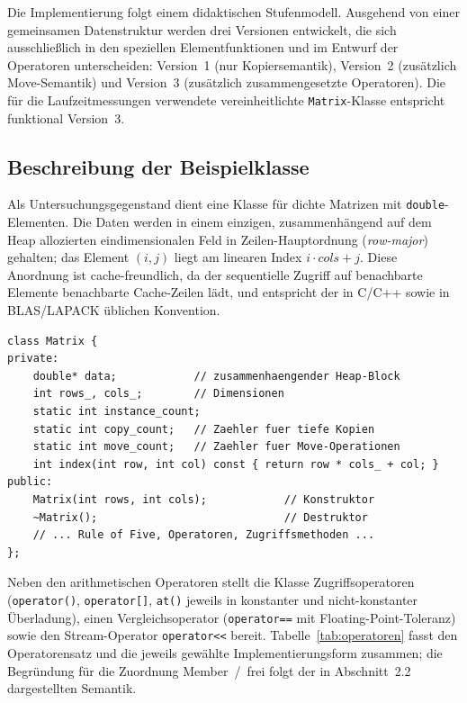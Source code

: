 \documentclass[10pt,a4paper]{article}
\begin{document}
Die Implementierung folgt einem didaktischen Stufenmodell. Ausgehend von einer
gemeinsamen Datenstruktur werden drei Versionen entwickelt, die sich
ausschließlich in den speziellen Elementfunktionen und im Entwurf der
Operatoren unterscheiden: Version~1 (nur Kopiersemantik), Version~2
(zusätzlich Move-Semantik) und Version~3 (zusätzlich zusammengesetzte
Operatoren). Die für die Laufzeitmessungen verwendete vereinheitlichte
\texttt{Matrix}-Klasse entspricht funktional Version~3.

\subsection{Beschreibung der Beispielklasse}
\label{sec:beispielklasse}

Als Untersuchungsgegenstand dient eine Klasse für dichte Matrizen mit
\texttt{double}-Elementen. Die Daten werden in einem einzigen, zusammenhängend
auf dem Heap allozierten eindimensionalen Feld in Zeilen-Hauptordnung
(\emph{row-major}) gehalten; das Element $(i,j)$ liegt am linearen Index
$i \cdot \mathit{cols} + j$. Diese Anordnung ist cache-freundlich, da der
sequentielle Zugriff auf benachbarte Elemente benachbarte Cache-Zeilen lädt,
und entspricht der in C/C++ sowie in BLAS/LAPACK üblichen Konvention.

\begin{lstlisting}[caption={Datenmodell und Instrumentierung der Matrix-Klasse}, label={lst:skeleton}]
class Matrix {
private:
    double* data;            // zusammenhaengender Heap-Block
    int rows_, cols_;        // Dimensionen
    static int instance_count;
    static int copy_count;   // Zaehler fuer tiefe Kopien
    static int move_count;   // Zaehler fuer Move-Operationen
    int index(int row, int col) const { return row * cols_ + col; }
public:
    Matrix(int rows, int cols);            // Konstruktor
    ~Matrix();                             // Destruktor
    // ... Rule of Five, Operatoren, Zugriffsmethoden ...
};
\end{lstlisting}

Neben den arithmetischen Operatoren stellt die Klasse Zugriffsoperatoren
(\texttt{operator()}, \texttt{operator[]}, \texttt{at()} jeweils in
konstanter und nicht-konstanter Überladung), einen Vergleichsoperator
(\texttt{operator==} mit Floating-Point-Toleranz) sowie den
Stream-Operator \texttt{operator<<} bereit. Tabelle~\ref{tab:operatoren}
fasst den Operatorensatz und die jeweils gewählte Implementierungsform
zusammen; die Begründung für die Zuordnung Member~/~frei folgt der in
Abschnitt~2.2 dargestellten Semantik.
\end{document}
